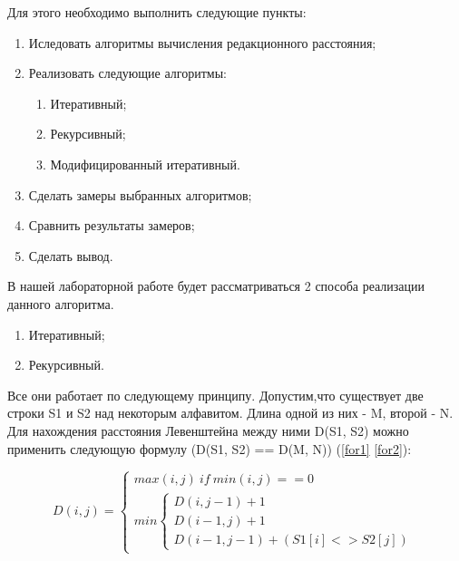 \documentclass[a4paper, 14pt]{article}
\begin{document}
	Для этого необходимо выполнить следующие пункты:
	
	\begin{enumerate}
		\item Иследовать алгоритмы вычисления редакционного расстояния;
		\item Реализовать следующие алгоритмы:
		\begin{enumerate}
			\item Итеративный;
			\item Рекурсивный;
			\item Модифицированный итеративный.
		\end{enumerate}
		\item Сделать замеры выбранных алгоритмов;
		\item Сравнить результаты замеров;
		\item Сделать вывод.
	\end{enumerate}
	
	\vspace{5mm}
	В нашей лабораторной работе будет рассматриваться 2 способа реализации данного алгоритма.
	
	\begin{enumerate}
		\item Итеративный;
		\item Рекурсивный.
	\end{enumerate}
		
	\vspace{5mm}
	Все они работает по следующему принципу. Допустим,что существует две строки S1 и S2 над некоторым алфавитом. Длина одной из них - M, второй - N. Для нахождения расстояния Левенштейна между ними D(S1, S2) можно применить следующую формулу (D(S1, S2) == D(M, N))\cite{primenenie}  (\ref{for1}  \ref{for2}):

		\begin{equation}\label{for1}
			D(i,j)=\begin{cases}
			max(i,j)\ if\ min(i,j) == 0\\
			min\begin{cases}
			D(i,j-1) + 1\\
			D(i-1,j) + 1\\
			D(i-1,j-1) + (S1[i] <> S2[j])
			\end{cases}
			\end{cases}
		\end{equation} 
		
\end{document}
